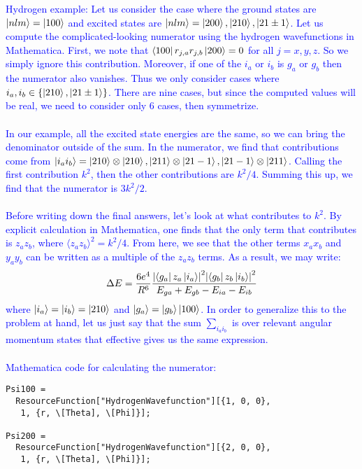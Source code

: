 \documentclass{article}
\theoremstyle{definition}
\newcommand{\f}[2]{\frac{#1}{#2}}
\begin{document}
\begin{enumerate}[label=(\alph*)]
\textcolor{blue}{Hydrogen example: Let us consider the case where the ground states are $\ket{nlm} = \ket{100}$ and excited states are $\ket{nlm} = \ket{200}, \ket{210}, \ket{21\pm1}$. Let us compute the complicated-looking numerator using the hydrogen wavefunctions in Mathematica.  First, we note that $\bra{100} r_{j,a} r_{j,b} \ket{200} = 0$ for all $j=x,y,z$. So we simply ignore this contribution. Moreover, if one of the $i_a$ or $i_b$ is $g_a$ or $g_b$ then the numerator also vanishes. Thus we only consider cases where $i_a, i_b \in \{ \ket{210}, \ket{21\pm 1} \}$. There are nine cases, but since the computed values will be real, we need to consider only 6 cases, then symmetrize. \\
\,\,\\ 
\noindent In our example, all the excited state energies are the same, so we can bring the denominator outside of the sum. In the numerator, we find that contributions come from $\ket{i_a i_b} = \ket{210}\otimes\ket{210}, \ket{211}\otimes\ket{21-1}, \ket{21-1}\otimes \ket{211}$. Calling the first contribution $k^2$, then the other contributions are $k^2/4$. Summing this up, we find that the numerator is $3k^2 /2$. \\
\,\,\\
\noindent Before writing down the final answers, let's look at what contributes to $k^2$. By explicit calculation in Mathematica, one finds that the only term that contributes is $z_a z_b$, where $\langle z_a z_b\rangle^2 = k^2/4$. From here, we see that the other terms $x_a x_b$ and $y_a y_b$ can be written as a multiple of the $z_a z_b$ terms. As a result, we may write:
\begin{align*}
\Delta E = \f{6e^4}{R^6} \f{ 
\abs{\bra{g_a} z_a \ket{i_a}}^2 
\abs{ \bra{g_b} z_b \ket{i_b} }^2
}{E_{ga} + E_{gb} - E_{ia} - E_{ib}}
\end{align*}
where $\ket{i_a} = \ket{i_b} = \ket{210}$ and $\ket{g_a} = \ket{g_b} \ket{100}$.  In order to generalize this to the problem at hand, let us just say that the sum $\sum_{i_ai_b}$ is over relevant angular momentum states that effective gives us the same expression. \\
\,\,\\
\noindent Mathematica code for calculating the numerator:}
\begin{lstlisting}
Psi100 = 
  ResourceFunction["HydrogenWavefunction"][{1, 0, 0}, 
   1, {r, \[Theta], \[Phi]}];

Psi200 = 
  ResourceFunction["HydrogenWavefunction"][{2, 0, 0}, 
   1, {r, \[Theta], \[Phi]}];


\end{lstlisting}
\end{enumerate}
\end{document}
